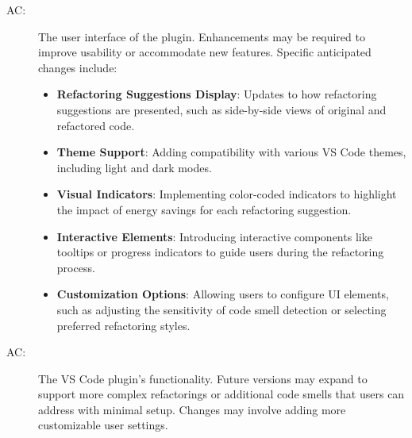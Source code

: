 \documentclass[12pt, titlepage]{article}
\newcounter{acnum}
\newcommand{\actheacnum}{AC\theacnum}
\begin{document}
\begin{description}
  \item[ \actheacnum \label{acUserInterface}:] The user interface of the plugin. Enhancements may be required to improve usability or accommodate new features. Specific anticipated changes include:
      \begin{itemize}
          \item \textbf{Refactoring Suggestions Display}: Updates to how refactoring suggestions are presented, such as side-by-side views of original and refactored code.
          \item \textbf{Theme Support}: Adding compatibility with various VS Code themes, including light and dark modes.
          \item \textbf{Visual Indicators}: Implementing color-coded indicators to highlight the impact of energy savings for each refactoring suggestion.
          \item \textbf{Interactive Elements}: Introducing interactive components like tooltips or progress indicators to guide users during the refactoring process.
          \item \textbf{Customization Options}: Allowing users to configure UI elements, such as adjusting the sensitivity of code smell detection or selecting preferred refactoring styles.
      \end{itemize}
  
  \item[ \actheacnum \label{acVSCodePlugin}:] The VS Code plugin's
    functionality. Future versions may expand to support more complex refactorings
    or additional code smells that users can address with minimal setup. Changes
    may involve adding more customizable user settings.
    

\end{description}
\end{document}
